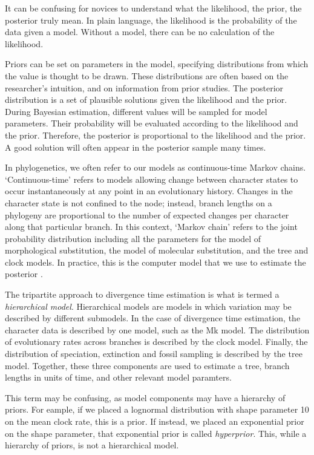 \documentclass[11pt]{article}
\makeatletter
\newenvironment{boxedtext}[1]{%
  \begin{mdframed}[frametitle=#1,
    frametitlefont=\scshape\mdseries\sffamily,
    frametitlealignment=\centering,
    backgroundcolor=black!20,
    hidealllines=true,
    innerleftmargin=11\p@,innerrightmargin=11\p@,
    frametitleaboveskip=0.5\baselineskip,
    innerbottommargin=0.5\baselineskip,
    skipabove=\baselineskip,skipbelow=0.5\baselineskip]
}{%
  \end{mdframed}%
}
\makeatother
\begin{document}
\begin{boxedtext}{Box 1. The likelihood, the prior, and the posterior}

It can be confusing for novices to understand what the likelihood, the prior, the posterior truly mean.
In plain language, the likelihood is the probability of the data given a model.
Without a model, there can be no calculation of the likelihood.

Priors can be set on parameters in the model, specifying distributions from which the value is thought to be drawn.
These distributions are often based on the researcher's intuition, and on information from prior studies.
The posterior distribution is a set of plausible solutions given the likelihood and the prior.
During Bayesian estimation, different values will be sampled for model parameters.
Their probability will be evaluated according to the likelihood and the prior.
Therefore, the posterior is proportional to the likelihood and the prior.
A good solution will often appear in the posterior sample many times.

In phylogenetics, we often refer to our models as continuous-time Markov chains.
`Continuous-time' refers to models allowing change between character states to occur instantaneously at any point in an evolutionary history.
Changes in the character state is not confined to the node; instead, branch lengths on a phylogeny are proportional to the number of expected changes per character along that particular branch. 
In this context, `Markov chain' refers to the  joint probability distribution including all the parameters for the model of morphological substitution, the model of molecular substitution, and the tree and clock models. 
In practice, this is the computer model that we use to estimate the posterior \cite{Hoehna2016b}.
\end{boxedtext}

\clearpage

\begin{boxedtext}{Box 2. Hierarchical Models}

The tripartite approach to divergence time estimation is what is termed a \textit{hierarchical model}. 
Hierarchical models are models in which variation may be described by different submodels.
In the case of divergence time estimation, the character data is described by one model, such as the Mk model.
The distribution of evolutionary rates across branches is described by the clock model.
Finally, the distribution of speciation, extinction and fossil sampling is described by the tree model.
Together, these three components are used to estimate a tree, branch lengths in units of time, and other relevant model paramters.

This term may be confusing, as model components may have a hierarchy of priors. 
For eample, if we placed a lognormal distribution with shape parameter 10 on the mean clock rate, this is a prior.
If instead, we placed an exponential prior on the shape parameter, that exponential prior is called \textit{hyperprior}.
This, while a hierarchy of priors, is not a hierarchical model. 

\end{boxedtext}
\end{document}

